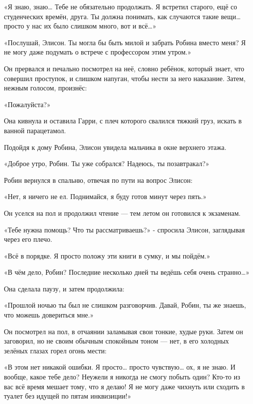 \documentclass[a4paper,12pt]{book}
\begin{document}
\par
«Я знаю, знаю… Тебе не обязательно продолжать. Я встретил старого, ещё со студенческих времён, друга. Ты должна понимать, как случаются такие вещи… просто у нас их было слишком много, вот и всё…»
\par
«Послушай, Элисон. Ты могла бы быть милой и забрать Робина вместо меня? Я не могу даже подумать о встрече с профессором этим утром.»
\par
Он прервался и печально посмотрел на неё, словно ребёнок, который знает, что совершил проступок, и слишком напуган, чтобы нести за него наказание. Затем, нежным голосом, произнёс:
\par
«Пожалуйста?»
\par
Она кивнула и оставила Гарри, с плеч которого свалился тяжкий груз, искать в ванной парацетамол.\\
\par
Подойдя к дому Робина, Элисон увидела мальчика в окне верхнего этажа.
\par
«Доброе утро, Робин. Ты уже собрался? Надеюсь, ты позавтракал?»
\par
Робин вернулся в спальню, отвечая по пути на вопрос Элисон:
\par
«Нет, я ничего не ел. Поднимайся, я буду готов минут через пять.»
\par
Он уселся на пол и продолжил чтение — тем летом он готовился к экзаменам.
\par
«Тебе нужна помощь? Что ты рассматриваешь?» - спросила Элисон, заглядывая через его плечо.
\par
«Всё в порядке. Я просто положу эти книги в сумку, и мы пойдём.»
\par
«В чём дело, Робин? Последние несколько дней ты ведёшь себя очень странно…»
\par
Она сделала паузу, и затем продолжила:
\par
«Прошлой ночью ты был не слишком разговорчив. Давай, Робин, ты же знаешь, что можешь довериться мне.»
\par
Он посмотрел на пол, в отчаянии заламывая свои тонкие, худые руки. Затем он заговорил, но не своим обычным спокойным тоном — нет, в его холодных зелёных глазах горел огонь мести:
\par
«В этом нет никакой ошибки. Я просто… просто чувствую… ох, я не знаю. И вообще, какое тебе дело? Неужели я никогда не смогу побыть один? Кто-то из вас всё время мешает тому, что я делаю! Я не могу даже чихнуть или сходить в туалет без идущей по пятам инквизиции!»
\par
\end{document}
